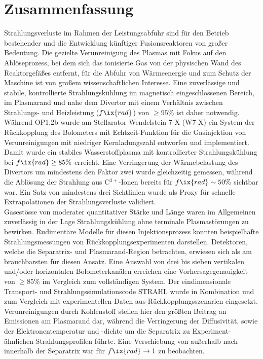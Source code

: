 
\checkoddpage\ifoddpage\clearpage\else\cleardoublepage\fi%

    \chapter*{Zusammenfassung}%

        Strahlungsverluste im Rahmen der Leistungsabfuhr sind für den Betrieb bestehender und die Entwicklung künftiger Fusionsreaktoren von großer Bedeutung. Die gezielte Verunreinigung des Plasmas mit Fokus auf den Ablöseprozess, bei dem sich das ionisierte Gas von der physischen Wand des Reaktorgefäßes entfernt, für die Abfuhr von Wärmeenergie und zum Schutz der Maschine ist von großem wissenschaftlichen Interesse. Eine zuverlässige und stabile, kontrollierte Strahlungskühlung im magnetisch eingeschlossenen Bereich, im Plasmarand und nahe dem Divertor mit einem Verhältnis zwischen Strahlungs- und Heizleistung ($f\ix{rad}$) von $\ge95\%$ ist daher notwendig.\\%
        Während OP1.2b wurde am Stellarator Wendelstein 7-X (W7-X) ein System der Rückkopplung des Bolometers mit Echtzeit-Funktion für die Gasinjektion von Verunreinigungen mit niedriger Kernladungszahl entworfen und implementiert. Damit wurde ein stabiles Wasserstoffplasma mit kontrollierter Strahlungskühlung bei $f\ix{rad}\ge85\%$ erreicht. Eine Verringerung der Wärmebelastung des Divertors um mindestens den Faktor zwei wurde gleichzeitig gemessen, während die Ablösung der Strahlung aus C$^{3+}$-Ionen bereits für $f\ix{rad}\sim50\%$ sichtbar war. Ein Satz von mindestens drei Sichtlinien wurde als Proxy für schnelle Extrapolationen der Strahlungsverluste validiert.\\%
        Gasestösse von moderater quantitativer Stärke und Länge waren im Allgemeinen zuverlässig in der Lage Strahlungskühlung ohne terminale Plasmastörungen zu bewirken. Rudimentäre Modelle für diesen Injektionsprozess konnten beispielhafte Strahlungsmessungen von Rückkopplungsexperimenten darstellen. Detektoren, welche die Separatrix- und Plasmarand-Region betrachten, erwiesen sich als am brauchbarsten für diesen Ansatz. Eine Auswahl von drei bis sieben vertikalen und/oder horizontalen Bolometerkanälen erreichen eine Vorhersagegenauigkeit von $\ge85\%$ im Vergleich zum vollständigen System. Der eindimensionale Transport- und Strahlungssimulationscode STRAHL wurde in Kombination und zum Vergleich mit experimentellen Daten aus Rückkopplungsszenarien eingesetzt. Verunreinigungen durch Kohlenstoff stellen hier den größten Beitrag an Emissionen am Plasmarand dar, während die Verringerung der Diffusivität, sowie der Elektronentemperatur und -dichte um die Separatrix zu Experiment-ähnlichen Strahlungsprofilen führte. Eine Verschiebung von außerhalb nach innerhalb der Separatrix war für $f\ix{rad}\rightarrow1$ zu beobachten.\\%
